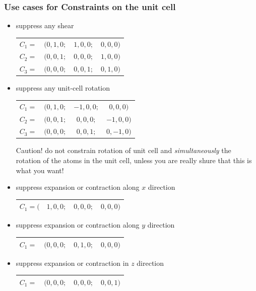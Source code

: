 \documentclass[final,12pt,makeidx,DIV=calc]{article}
\begin{document}
{{{{{{%
\subsubsection{Use cases for Constraints on the unit cell}
\label{sec:usecasecellconstr}
\begin{itemize}
    \item suppress any shear
\begin{center}
\begin{tabular}{|cccc|}
\hline
$C_1=$&$(0,1,0;$&$ 1,0,0 ;$&$ 0,0,0)$\\
$C_2=$&$(0,0,1;$&$ 0,0,0 ;$&$ 1,0,0)$\\
$C_3=$&$(0,0,0;$&$ 0,0,1 ;$&$ 0,1,0)$\\
\hline
\end{tabular}
\end{center}
%
\item suppress any unit-cell rotation\\
\begin{center}
\begin{tabular}{|cccc|}
\hline
$C_1=$&$(0,1,0;$&$ -1,0,0;$&$ 0,0,0)$\\
$C_2=$&$(0,0,1;$&$ 0,0,0 ;$&$ -1,0,0)$\\
$C_3=$&$(0,0,0;$&$ 0,0,1 ;$&$ 0,-1,0)$\\
\hline
\end{tabular}
\end{center}
Caution! do not constrain rotation of unit cell and
\textit{simultaneously} the rotation of the atoms in the unit cell,
unless you are really shure that this is what you want!
%
\item suppress expansion or contraction along $x$ direction
\begin{center}
\begin{tabular}{|cccc|}
\hline
$C_1=($&$1,0,0;$&$ 0,0,0 ;$&$ 0,0,0)$\\
\hline
\end{tabular}
\end{center}
%
\item suppress expansion or contraction along $y$ direction
\begin{center}
\begin{tabular}{|cccc|}
\hline
$C_1=$&$(0,0,0;$&$ 0,1,0 ;$&$ 0,0,0)$\\
\hline
\end{tabular}
\end{center}
%
\item suppress expansion or contraction in $z$ direction
\begin{center}
\begin{tabular}{|cccc|}
\hline
$C_1=$&$(0,0,0;$&$ 0,0,0 ;$&$ 0,0,1)$\\
\hline
\end{tabular}
\end{center}
%
\end{itemize}

}}}}}}
\end{document}
